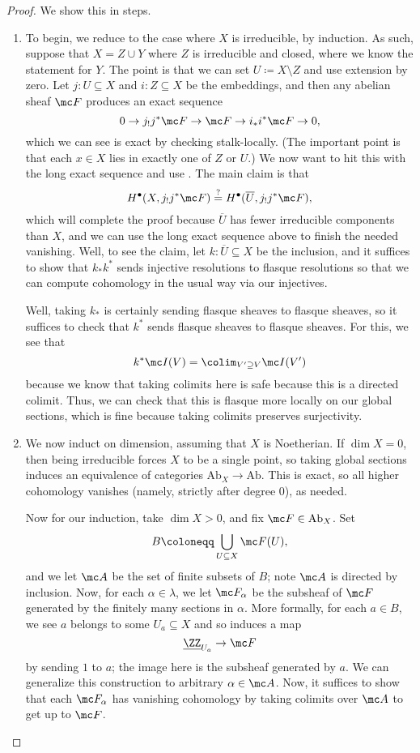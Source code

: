 \documentclass[../notes.tex]{subfiles}
\begin{document}
\begin{proof}
	We show this in steps.
	\begin{enumerate}
		\item To begin, we reduce to the case where $X$ is irreducible, by induction. As such, suppose that $X=Z\cup Y$ where $Z$ is irreducible and closed, where we know the statement for $Y$. The point is that we can set $U\coloneqq X\setminus Z$ and use extension by zero. Let $j\colon U\subseteq X$ and $i\colon Z\subseteq X$ be the embeddings, and then any abelian sheaf $\mc F$ produces an exact sequence
		\[0\to j_!j^*\mc F\to\mc F\to i_*i^*\mc F\to0,\]
		which we can see is exact by checking stalk-locally. (The important point is that each $x\in X$ lies in exactly one of $Z$ or $U$.) We now want to hit this with the long exact sequence and use . The main claim is that
		\[H^\bullet(X,j_!j^*\mc F)\stackrel?=H^\bullet(\overline U,j_!j^*\mc F),\]
		which will complete the proof because $\overline U$ has fewer irreducible components than $X$, and we can use the long exact sequence above to finish the needed vanishing. Well, to see the claim, let $k\colon\overline U\subseteq X$ be the inclusion, and it suffices to show that $k_*k^*$ sends injective resolutions to flasque resolutions so that we can compute cohomology in the usual way via our injectives.

		Well, taking $k_*$ is certainly sending flasque sheaves to flasque sheaves, so it suffices to check that $k^*$ sends flasque sheaves to flasque sheaves. For this, we see that
		\[k^*\mc I(V)=\colim_{V'\supseteq V}\mc I(V')\]
		because we know that taking colimits here is safe because this is a directed colimit. Thus, we can check that this is flasque more locally on our global sections, which is fine because taking colimits preserves surjectivity.

		\item We now induct on dimension, assuming that $X$ is Noetherian. If $\dim X=0$, then being irreducible forces $X$ to be a single point, so taking global sections induces an equivalence of categories $\mathrm{Ab}_X\to\mathrm{Ab}$. This is exact, so all higher cohomology vanishes (namely, strictly after degree $0$), as needed.

		Now for our induction, take $\dim X>0$, and fix $\mc F\in\mathrm{Ab}_X$. Set
		\[B\coloneqq\bigcup_{U\subseteq X}\mc F(U),\]
		and we let $\mc A$ be the set of finite subsets of $B$; note $\mc A$ is directed by inclusion. Now, for each $\alpha\in\lambda$, we let $\mc F_\alpha$ be the subsheaf of $\mc F$ generated by the finitely many sections in $\alpha$. More formally, for each $a\in B$, we see $a$ belongs to some $U_a\subseteq X$ and so induces a map
		\[\underline\ZZ_{U_a}\to\mc F\]
		by sending $1$ to $a$; the image here is the subsheaf generated by $a$. We can generalize this construction to arbitrary $\alpha\in\mc A$. Now, it suffices to show that each $\mc F_\alpha$ has vanishing cohomology by taking colimits over $\mc A$ to get up to $\mc F$.


\end{enumerate}
\end{proof}
\end{document}
